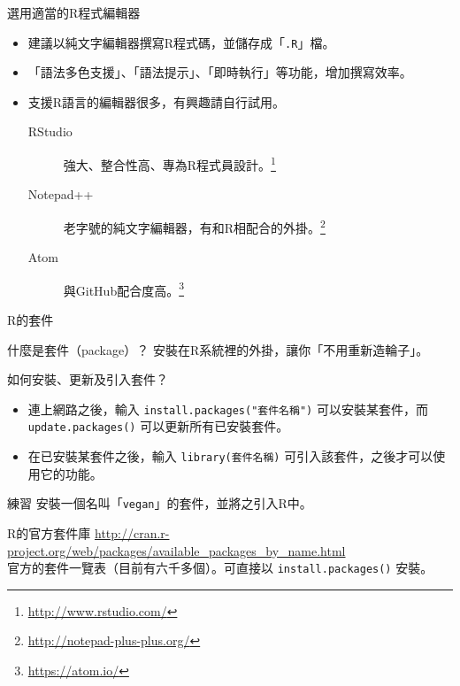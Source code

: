 \documentclass[12pt]{beamer}
\let\oldfootnote\footnote
\renewcommand\footnote[1]{\hspace{-0.6em}\oldfootnote{\scriptsize\ignorespaces#1}\hspace{0.6em}}
\begin{document}
\begin{frame}[fragile]{選用適當的R程式編輯器}
\begin{itemize}
\item 建議以純文字編輯器撰寫R程式碼，並儲存成「\verb+.R+」檔。
\item 「語法多色支援」、「語法提示」、「即時執行」等功能，增加撰寫效率。
\item 支援R語言的編輯器很多，有興趣請自行試用。
\begin{description}
	\item [RStudio] 強大、整合性高、專為R程式員設計。\footnote{\url{http://www.rstudio.com/}}
	\item [Notepad++] 老字號的純文字編輯器，有和R相配合的外掛。\footnote{\url{http://notepad-plus-plus.org/}}
	\item [Atom] 與GitHub配合度高。\footnote{\url{https://atom.io/}}
\end{description}
\end{itemize}
\end{frame}


\begin{frame}[fragile]{R的套件}
\begin{block}{什麼是套件（package）？}
安裝在R系統裡的外掛，讓你「不用重新造輪子」。
\end{block}

\begin{block}{如何安裝、更新及引入套件？}
\begin{itemize}
\item 連上網路之後，輸入
\verb+install.packages("套件名稱")+
可以安裝某套件，而
\verb+update.packages()+
可以更新所有已安裝套件。
\item 在已安裝某套件之後，輸入
\verb+library(套件名稱)+
可引入該套件，之後才可以使用它的功能。
\end{itemize}
\end{block}

\begin{block}{練習}
安裝一個名叫「\verb+vegan+」的套件，並將之引入R中。
\end{block}
\end{frame}

\begin{frame}[fragile]{R的官方套件庫}
\url{http://cran.r-project.org/web/packages/available_packages_by_name.html}\\
官方的套件一覽表（目前有六千多個）。可直接以 \verb+install.packages()+ 安裝。
\end{frame}
\end{document}
